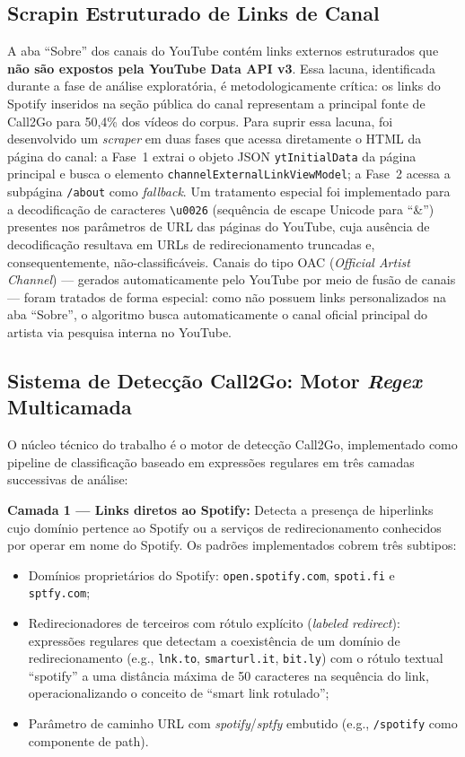 \documentclass[12pt, a4paper]{article}
\begin{document}
\subsection{Scrapin Estruturado de Links de Canal}

A aba ``Sobre'' dos canais do YouTube contém links externos estruturados que \textbf{não são expostos pela YouTube Data API v3}. Essa lacuna, identificada durante a fase de análise exploratória, é metodologicamente crítica: os links do Spotify inseridos na seção pública do canal representam a principal fonte de Call2Go para 50,4\% dos vídeos do corpus. Para suprir essa lacuna, foi desenvolvido um \textit{scraper} em duas fases que acessa diretamente o HTML da página do canal: a Fase~1 extrai o objeto JSON \texttt{ytInitialData} da página principal e busca o elemento \texttt{channelExternalLinkViewModel}; a Fase~2 acessa a subpágina \texttt{/about} como \textit{fallback}. Um tratamento especial foi implementado para a decodificação de caracteres \texttt{\textbackslash u0026} (sequência de escape Unicode para ``\&'') presentes nos parâmetros de URL das páginas do YouTube, cuja ausência de decodificação resultava em URLs de redirecionamento truncadas e, consequentemente, não-classificáveis. Canais do tipo OAC (\textit{Official Artist Channel}) --- gerados automaticamente pelo YouTube por meio de fusão de canais --- foram tratados de forma especial: como não possuem links personalizados na aba ``Sobre'', o algoritmo busca automaticamente o canal oficial principal do artista via pesquisa interna no YouTube.

\subsection{Sistema de Detecção Call2Go: Motor \textit{Regex} Multicamada}

O núcleo técnico do trabalho é o motor de detecção Call2Go, implementado como pipeline de classificação baseado em expressões regulares em três camadas successivas de análise:

\textbf{Camada 1 --- Links diretos ao Spotify:} Detecta a presença de hiperlinks cujo domínio pertence ao Spotify ou a serviços de redirecionamento conhecidos por operar em nome do Spotify. Os padrões implementados cobrem três subtipos:
\begin{itemize}
    \item Domínios proprietários do Spotify: \texttt{open.spotify.com}, \texttt{spoti.fi} e \texttt{sptfy.com};
    \item Redirecionadores de terceiros com rótulo explícito (\textit{labeled redirect}): expressões regulares que detectam a coexistência de um domínio de redirecionamento (e.g., \texttt{lnk.to}, \texttt{smarturl.it}, \texttt{bit.ly}) com o rótulo textual ``spotify'' a uma distância máxima de 50 caracteres na sequência do link, operacionalizando o conceito de ``smart link rotulado'';
    \item Parâmetro de caminho URL com \textit{spotify}/\textit{sptfy} embutido (e.g., \texttt{/spotify} como componente de path).
\end{itemize}
\end{document}

